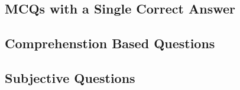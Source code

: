 \subsection*{MCQs with a Single Correct Answer}
\begin{enumerate}[label=\thesubsection.\arabic*,ref=\thesubsection.\theenumi]







\end{enumerate}
\subsection*{Comprehenstion Based Questions}
\begin{enumerate}[label=\thesubsection.\arabic*,ref=\thesubsection.\theenumi]




\end{enumerate}
\subsection*{Subjective Questions}
\begin{enumerate}[label=\thesubsection.\arabic*,ref=\thesubsection.\theenumi]





\end{enumerate}
